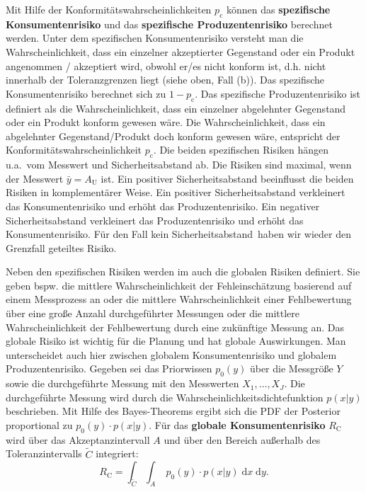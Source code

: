 Mit Hilfe der Konformitätswahrscheinlichkeiten $p_\mathrm{c}$ können das \textbf{spezifische Konsumentenrisiko} und das \textbf{spezifische Produzentenrisiko} berechnet werden. Unter dem spezifischen Konsumentenrisiko versteht man die Wahrscheinlichkeit, dass ein einzelner akzeptierter Gegenstand oder ein Produkt angenommen / akzeptiert wird, obwohl er/es nicht konform ist, d.h. nicht innerhalb der Toleranzgrenzen liegt (siehe oben, Fall (b)). Das spezifische Konsumentenrisiko berechnet sich zu $1-p_\mathrm{c}$. Das spezifische Produzentenrisiko ist definiert als die Wahrscheinlichkeit, dass ein einzelner abgelehnter Gegenstand oder ein Produkt konform gewesen wäre. Die Wahrscheinlichkeit, dass ein abgelehnter Gegenstand/Produkt doch konform gewesen wäre, entspricht der Konformitätswahrscheinlichkeit $p_\mathrm{c}$.
Die beiden spezifischen Risiken hängen u.a.\ vom Messwert und Sicherheitsabstand ab. Die
Risiken sind maximal, wenn der Messwert $\bar y = A_\textrm{U}$ ist. Ein positiver Sicherheitsabstand beeinflusst die beiden Risiken in komplementärer Weise. Ein positiver Sicherheitsabstand verkleinert das Konsumentenrisiko und erhöht das Produzentenrisiko.
Ein negativer Sicherheitsabstand verkleinert das Produzentenrisiko und erhöht das Konsumentenrisiko. Für den Fall  \glqq kein Sicherheitsabstand\grqq ~haben wir wieder
den Grenzfall \glqq geteiltes Risiko\grqq.

Neben den spezifischen Risiken werden im \cite{JCGM106} auch die globalen Risiken definiert. Sie geben bspw. die mittlere Wahrscheinlichkeit der Fehleinschätzung basierend auf einem Messprozess an oder die mittlere Wahrscheinlichkeit einer Fehlbewertung über eine große Anzahl durchgeführter Messungen oder die mittlere Wahrscheinlichkeit der Fehlbewertung durch eine zukünftige Messung an. Das globale Risiko ist wichtig für die Planung und hat globale Auswirkungen. Man unterscheidet auch hier zwischen globalem Konsumentenrisiko und globalem Produzentenrisiko.
Gegeben sei das Priorwissen $p_0(y)$ über die Messgröße $Y$ sowie die durchgeführte Messung mit den Messwerten $X_1,\ldots , X_J$. Die durchgeführte Messung wird durch die Wahrscheinlichkeitsdichtefunktion $p(x|y)$ beschrieben. Mit Hilfe des Bayes-Theorems ergibt sich die PDF der Posterior proportional zu $p_0(y)\cdot p(x|y)$. Für das \textbf{globale Konsumentenrisiko} $R_\mathrm{C}$  wird über das Akzeptanzintervall $A$ und über den
Bereich außerhalb des Toleranzintervalls $\tilde C$ integriert:
\begin{equation}
	R_\mathrm{C} =  \int_{\tilde C} \int_{A} \; p_0(y) \cdot p(x|y) \;\mathrm{d}x\; \mathrm{d}y.
	\label{eq:globalesKonsumentenrisiko}
\end{equation}

